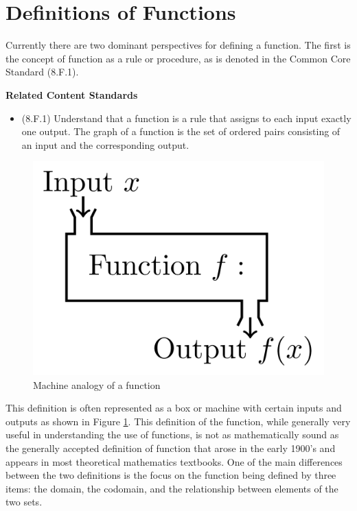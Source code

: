\documentclass[
]{book}
\providecommand{\tightlist}{%
  \setlength{\itemsep}{0pt}\setlength{\parskip}{0pt}}
\newenvironment{standards}{}{}
\let\stdsection\section
\renewcommand\section{\newpage\stdsection}
\theoremstyle{definition}
\theoremstyle{definition}
\theoremstyle{definition}
\theoremstyle{definition}
\theoremstyle{remark}
\begin{document}
\hypertarget{Function-Def}{%
\section{Definitions of Functions}\label{Function-Def}}

Currently there are two dominant perspectives for defining a function. The first is the concept of function as a rule or procedure, as is denoted in the Common Core Standard (8.F.1).

\begin{standards}

\begin{center}
\textbf{Related Content Standards}

\end{center}

\begin{itemize}
\tightlist
\item
  (8.F.1) Understand that a function is a rule that assigns to each input exactly one output. The graph of a function is the set of ordered pairs consisting of an input and the corresponding output.
\end{itemize}

\end{standards}

\begin{figure}

{\centering \includegraphics[width=0.4\linewidth]{tikz/function-machine} 

}

\caption{Machine analogy of a function}\label{fig:machine}
\end{figure}

This definition is often represented as a box or machine with certain inputs and outputs as shown in Figure \ref{fig:machine}. This definition of the function, while generally very useful in understanding the use of functions, is not as mathematically sound as the generally accepted definition of function that arose in the early 1900's and appears in most theoretical mathematics textbooks. One of the main differences between the two definitions is the focus on the function being defined by three items: the domain, the codomain, and the relationship between elements of the two sets.
\end{document}
